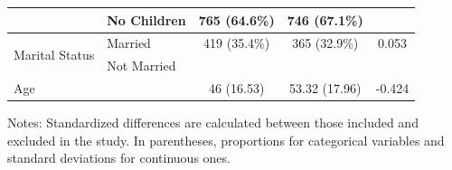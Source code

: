 \documentclass[12pt]{article}
\begin{document}
\begin{table}[htbp]
\begin{threeparttable}
\begin{tabular}{llccc}
                          & No Children  & 765 (64.6\%) & 746 (67.1\%) & \\
\midrule
\multirow{2}{*}{Marital Status} & Married     & 419 (35.4\%) & 365 (32.9\%) & 0.053 \\
                                & Not Married &             &             & \\
\midrule
Age  & & 46 (16.53) & 53.32 (17.96) & -0.424 \\
\bottomrule
\end{tabular}
\begin{tablenotes}
\footnotesize
\item Notes: Standardized differences are calculated between those included and excluded in the study. In parentheses, proportions for categorical variables and standard deviations for continuous ones.
\end{tablenotes}
\end{threeparttable}
\end{table}

\clearpage


\end{document}
